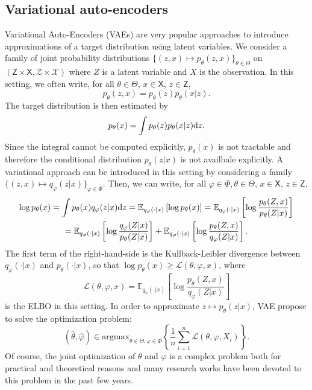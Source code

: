 \documentclass[english,graybox,envcountchap,envcountsame,sectrefs,shortlabels]{svmono}
\theoremstyle{style}
\newcommand{\eqsp}{}
\begin{document}
\subsection{Variational auto-encoders}
Variational Auto-Encoders (VAEs) are very popular approaches to introduce approximations of a target distribution using latent variables. We consider a family of joint probability distributions $\{(z,x) \mapsto  p_{\theta}(z,x)\}_{\theta\in\Theta}$ on $(\mathsf{Z}\times \mathsf{X}, \mathcal{Z}\times \mathcal{X})$ where $Z$ is a latent variable and $X$ is the observation. In this setting, we often write, for all $\theta\in\Theta$, $x\in \mathsf{X}$, $z\in \mathsf{Z}$,
$$
p_{\theta}(z,x) = p_{\theta}(z)p_{\theta}(x|z)\eqsp.
$$
The target distribution is then estimated by
$$
p_\theta(x) = \int p_{\theta}(z)p_{\theta}(x|z)\rmd z\eqsp.
$$
Since the integral cannot be computed explicitly, $p_\theta(x)$ is not tractable and therefore the conditional distribution $p_{\theta}(z|x)$ is not availbale explicitly. A variational approach can be introduced in this setting by considering a family $\{(z,x) \mapsto q_{\varphi}(z|x)\}_{\varphi\in\Phi}$. Then, we can write, for all $\varphi\in\Phi,\theta\in\Theta$, $x\in\mathsf{X}$, $z\in\mathsf{Z}$,
\begin{multline*}
\log p_\theta(x) = \int p_\theta(x) q_{\varphi}(z|x) \mathrm{d} z = \mathbb{E}_{q_{\varphi}(\cdot|x)}\left[\log p_\theta(x)\right] = \mathbb{E}_{q_{\varphi}(\cdot|x)}\left[\log \frac{p_\theta(Z,x)}{p_\theta(Z|x)}\right] \\
= \mathbb{E}_{q_{\varphi}(\cdot|x)}\left[\log \frac{q_{\varphi}(Z|x)}{p_\theta(Z|x)}\right]  + \mathbb{E}_{q_{\varphi}(\cdot|x)}\left[\log \frac{p_\theta(Z,x)}{q_{\varphi}(Z|x)}\right] .
\end{multline*}
The first term of the right-hand-side is the Kullback-Leibler divergence between $q_{\varphi}(\cdot|x)$ and $p_\theta(\cdot|x)$, so that $\log p_\theta(x)\geq \mathcal{L}(\theta,\varphi,x)$, where
\begin{equation}
\label{eq:elbo:main}
\mathcal{L}(\theta,\varphi,x) = \mathbb{E}_{q_{\varphi}(\cdot|x)}\left[\log \frac{p_\theta(Z,x)}{q_{\varphi}(Z|x)}\right]
\end{equation}
is the ELBO in this setting. In order to approximate $z\mapsto p_\theta(z|x)$, VAE propose to solve the optimization problem:
$$
(\widehat \theta ,\widehat \varphi) \in \mathrm{argmax}_{\theta\in\Theta ,\varphi\in\Phi}\left\{ \frac{1}{n}\sum_{i=1}^n \mathcal{L}(\theta,\varphi,X_i)\right\}\eqsp.
$$
Of course, the joint optimization of $\theta$ and $\varphi$ is a complex problem both for practical and theoretical reasons and many research works have been devoted to this problem in the past few years.
\end{document}
